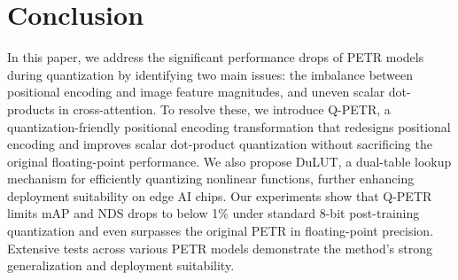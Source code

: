 

\section{Conclusion}
In this paper, we address the significant performance drops of PETR models during quantization by identifying two main issues: the imbalance between positional encoding and image feature magnitudes, and uneven scalar dot-products in cross-attention. To resolve these, we introduce Q-PETR, a quantization-friendly positional encoding transformation that redesigns positional encoding and improves scalar dot-product quantization without sacrificing the original floating-point performance. We also propose DuLUT, a dual-table lookup mechanism for efficiently quantizing nonlinear functions, further enhancing deployment suitability on edge AI chips. Our experiments show that Q-PETR limits mAP and NDS drops to below 1\% under standard 8-bit post-training quantization and even surpasses the original PETR in floating-point precision. Extensive tests across various PETR models demonstrate the method’s strong generalization and deployment suitability.
